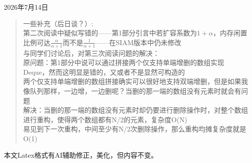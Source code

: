 \documentclass[11pt,a4paper]{article}
\begin{document}
\noindent 2026年7月14日
\begin{quote}
    一些补充（后日谈？）:\\
    第二次阅读中疑似写错的——第1部分引言中若扩容系数为$1+\alpha $，内存闲置比例可达$\frac{\alpha}{\alpha+1}$而不是$\frac{1}{\alpha+1}$——在SIAM版本中仍未修改\\
    与同学们讨论后，对第三次阅读问题的解决：\\
    原问题：第1部分中说可以通过拼接两个仅支持单端增删的数组实现Deque，然而这明显是错的，又或者不是显然可构造的\\
    两个仅支持单端增删的数组拼接确实可以很好地支持双端增删，但是如果我像队列那样，一边增，一边删呢？当删的那一端的数组没有元素时就会有问题\\
    解决：当删的那一端的数组没有元素时却仍要进行删除操作时，对整个数组进行重构，使得两个数组都有N/2的元素，复杂度O(N)\\
    易见到下一次重构，中间至少有N/2次删除操作，那么重构均摊复杂度就是O(1)\\
\end{quote}
本文Latex格式有AI辅助修正，美化，但内容不变。
\end{document}
